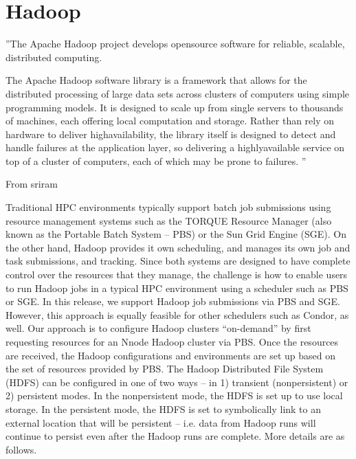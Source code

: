 
\section{Hadoop}\label{S:hadoop}

 
''The Apache Hadoop project develops opensource software for reliable, scalable, distributed computing.

The Apache Hadoop software library is a framework that allows for the distributed processing of large data sets across clusters of computers using simple programming models. It is designed to scale up from single servers to thousands of machines, each offering local computation and storage. Rather than rely on hardware to deliver highavailability, the library itself is designed to detect and handle failures at the application layer, so delivering a highlyavailable service on top of a cluster of computers, each of which may be prone to failures.
'' \cite{www/hadoop}

From sriram \cite{report/myhadoop}

Traditional HPC environments typically support batch job submissions
using resource management systems such as the TORQUE Resource Manager (also known as the
Portable Batch System – PBS) or the Sun Grid Engine (SGE). On the other hand, Hadoop
provides it own scheduling, and manages its own job and task submissions, and tracking.
Since both systems are designed to have complete control over the resources that they
manage, the challenge is how to enable users to run Hadoop jobs in a typical HPC
environment using a scheduler such as PBS or SGE. In this release, we support Hadoop
job submissions via PBS and SGE. However, this approach is equally feasible for other
schedulers such as Condor, as well.
Our approach is to configure Hadoop clusters “on-demand” by first requesting resources
for an Nnode Hadoop cluster via PBS. Once the resources are received, the Hadoop
configurations and environments are set up based on the set of resources provided by
PBS. The Hadoop Distributed File System (HDFS) can be configured in one of two ways
– in 1) transient (nonpersistent) or 2) persistent modes. In the nonpersistent mode, the
HDFS is set up to use local storage. In the persistent mode, the HDFS is set to
symbolically link to an external location that will be persistent – i.e. data from Hadoop
runs will continue to persist even after the Hadoop runs are complete. More details are as
follows.

